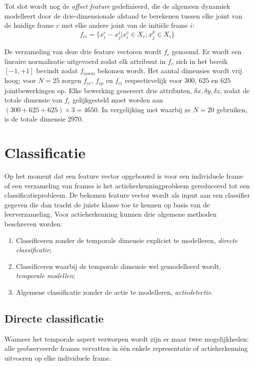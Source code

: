 Tot slot wordt nog de \textit{offset feature} gedefinieerd, die de algemeen dynamiek modelleert door de drie-dimensionale afstand te berekenen tussen elke joint van de huidige frame $c$ met elke andere joint van de initiële frame $i$:
$$f_{ci} = \{x_i^c - x_j^i |  x_i^c \in X_c ; x_j^p \in X_i \}$$

De verzameling van deze drie feature vectoren wordt $f_c$ genoemd. Er wordt een lineaire normalisatie uitgevoerd zodat elk attribuut in $f_c$ zich in het bereik $[-1, +1]$ bevindt zodat $f_{norm}$ bekomen wordt. Het aantal dimensies wordt vrij hoog; voor $N = 25$ zorgen $f_{cc}$, $f_{cp}$ en $f_{ci}$ respectievelijk voor $300$, $625$ en $625$ jointbewerkingen op. Elke bewerking genereert drie attributen, $\delta x, \delta y, \delta z$, zodat de totale dimensie van $f_c$ gelijkgesteld moet worden aan $ (300 + 625 + 625) \times 3 = 4650$. In vergelijking met \cite{Yang2012} waarbij ze $N = 20$ gebruiken, is de totale dimensie $2970$.


\chapter{Classificatie}
Op het moment dat een feature vector opgebouwd is voor een individuele frame of een verzameling van frames is het actieherkenningprobleem gereduceerd tot een classificatieprobleem. De bekomen feature vector wordt als input aan een classifier gegeven die dan tracht de juiste klasse toe te kennen op basis van de leerverzameling. Voor actieherkenning kunnen drie algemene methoden beschreven worden:
\begin{enumerate}
	\item Classificeren zonder de temporale dimensie expliciet te modelleren, \textit{directe classificatie};
	\item Classificeren waarbij de temporale dimensie wel gemodelleerd wordt, \textit{temporale modellen};
	\item Algemene classificatie zonder de actie te modelleren, \textit{actiedetectie}.
\end{enumerate}


\section{Directe classificatie}
Wanneer het temporale aspect verworpen wordt zijn er maar twee mogelijkheden: alle geobserveerde frames vervatten in één enkele representatie of actieherkenning uitvoeren op elke individuele frame. 

